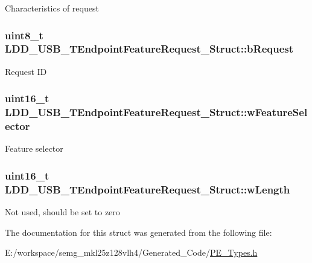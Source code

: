 Characteristics of request \hypertarget{struct_l_d_d___u_s_b___t_endpoint_feature_request___struct_acd2dcd4a8762d22f84cfe3b9d9607a25}{
\subsubsection[{b\-Request}]{\setlength{\rightskip}{0pt plus 5cm}uint8\-\_\-t L\-D\-D\-\_\-\-U\-S\-B\-\_\-\-T\-Endpoint\-Feature\-Request\-\_\-\-Struct\-::b\-Request}}\label{struct_l_d_d___u_s_b___t_endpoint_feature_request___struct_acd2dcd4a8762d22f84cfe3b9d9607a25}
Request I\-D \hypertarget{struct_l_d_d___u_s_b___t_endpoint_feature_request___struct_aa026e7ce420430dc65a72dcc10337553}{
\subsubsection[{w\-Feature\-Selector}]{\setlength{\rightskip}{0pt plus 5cm}uint16\-\_\-t L\-D\-D\-\_\-\-U\-S\-B\-\_\-\-T\-Endpoint\-Feature\-Request\-\_\-\-Struct\-::w\-Feature\-Selector}}\label{struct_l_d_d___u_s_b___t_endpoint_feature_request___struct_aa026e7ce420430dc65a72dcc10337553}
Feature selector \hypertarget{struct_l_d_d___u_s_b___t_endpoint_feature_request___struct_aec7dc034039bc4deb5c811afac0686a5}{
\subsubsection[{w\-Length}]{\setlength{\rightskip}{0pt plus 5cm}uint16\-\_\-t L\-D\-D\-\_\-\-U\-S\-B\-\_\-\-T\-Endpoint\-Feature\-Request\-\_\-\-Struct\-::w\-Length}}\label{struct_l_d_d___u_s_b___t_endpoint_feature_request___struct_aec7dc034039bc4deb5c811afac0686a5}
Not used, should be set to zero 

The documentation for this struct was generated from the following file\-:\begin{DoxyCompactItemize}
\item 
E\-:/workspace/semg\-\_\-mkl25z128vlh4/\-Generated\-\_\-\-Code/\hyperlink{_p_e___types_8h}{P\-E\-\_\-\-Types.\-h}\end{DoxyCompactItemize}
